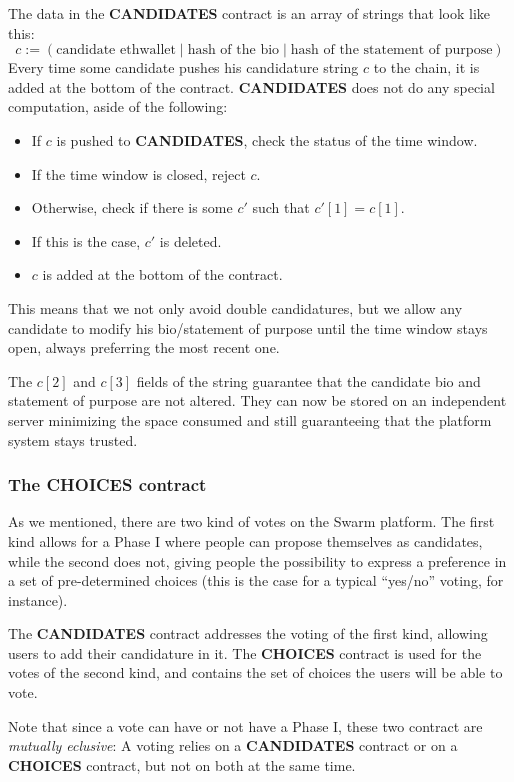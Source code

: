 \documentclass[submission, copyright,creativecommons,sharealike,noncommercial]{eptcs}
\newcommand{\Candidates}{\textbf{CANDIDATES}\xspace}
\newcommand{\Choices}{\textbf{CHOICES}\xspace}
\begin{document}
	The data in the \Candidates contract is an array of strings that look like this: 
	\[
		c := (\text{candidate ethwallet} \mid \text{hash of the bio} \mid \text{hash of the statement of purpose})
	\]
	Every time some candidate pushes his candidature string $c$ to the chain, it is added at the bottom of the contract. \Candidates does not do any special computation, aside of the following:
	\begin{itemize}
		\item If $c$ is pushed to \Candidates, check the status of the time window.
		\item If the time window is closed, reject $c$.
		\item Otherwise, check if there is some $c'$ such that $c'[1] = c[1]$.
		\item If this is the case, $c'$ is deleted.
		\item $c$ is added at the bottom of the contract.
	\end{itemize}
%
	This means that we not only avoid double candidatures, but we allow any candidate to modify his bio/statement of purpose until the time window stays open, always preferring the most recent one.

	The $c[2]$ and $c[3]$ fields of the string guarantee that the candidate bio and statement of purpose are not altered. They can now be stored on an independent server minimizing the space consumed and still guaranteeing that the platform system stays trusted.	 
%
%
\subsubsection{The \Choices contract}
	As we mentioned, there are two kind of votes on the Swarm platform. The first kind allows for a Phase I where people can propose themselves as candidates, while the second does not, giving people the possibility to express a preference in a set of pre-determined choices (this is the case for a typical ``yes/no'' voting, for instance).
	
	The \Candidates contract addresses the voting of the first kind, allowing users to add their candidature in it. The \Choices contract is used for the votes of the second kind, and contains the set of choices the users will be able to vote. 
	
	Note that since a vote can have or not have a Phase I, these two contract are \emph{mutually eclusive}: A voting relies on a \Candidates contract or on a \Choices contract, but not on both at the same time.
	
\end{document}
